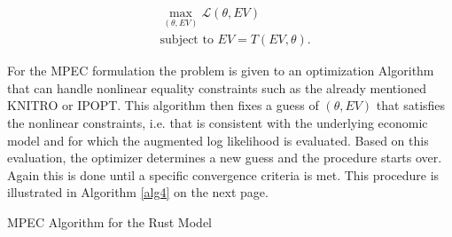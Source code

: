 \begin{equation}
\begin{aligned}
& \max_{(\theta, EV)} \mathcal{L}(\theta, EV) \\
& \text{subject to } EV = T(EV, \theta).
\end{aligned}
\label{eq2}
\end{equation}

For the MPEC formulation the problem is given to an optimization Algorithm that can handle nonlinear equality constraints such as the already mentioned KNITRO or IPOPT. This algorithm then fixes a guess of $(\theta, EV)$ that satisfies the nonlinear constraints, i.e. that is consistent with the underlying economic model and for which the augmented log likelihood is evaluated. Based on this evaluation, the optimizer determines a new guess and the procedure starts over. Again this is done until a specific convergence criteria is met. This procedure is illustrated in Algorithm \ref{alg4} on the next page. 


\vspace{2ex}
\begin{algorithm}[!h]
	\caption{MPEC Algorithm for the Rust Model}
	\label{alg4}
	\SetAlgoLined
\end{algorithm}
\vspace{2ex}


